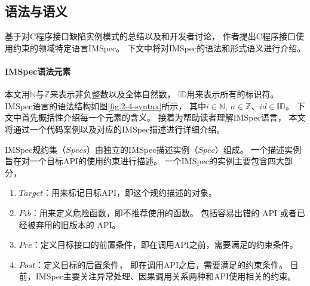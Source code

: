 \newcommand{\Nat}{\mathbb{N}}
\newcommand{\Int}{\mathbb{Z}}
\newcommand{\ID}{\mathbb{ID}}
\newcommand{\Cond}{\mathit{Cond}}
\newcommand{\true}{\texttt{true}}
\newcommand{\Pre}{\mathit{Pre}}
\newcommand{\Post}{\mathit{Post}}
\newcommand{\Fib}{\mathit{Fib}}
\newcommand{\Ret}{\mathit{Return}}
\newcommand{\ReturnFun}[1]{\texttt{\textbf{RETURN}(}#1\texttt{)}}
\newcommand{\Call}{\mathit{Call}}
\newcommand{\CallFun}[1]{\texttt{\textbf{Call}(}#1\texttt{)}}
\newcommand{\NULL}{\texttt{\textbf{NULL}}}
\newcommand{\FunName}{\mathit{FunName}}
\newcommand{\FunSig}{\mathit{FunSig}}
\newcommand{\Action}{\mathit{Action}}
\newcommand{\Arg}{\mathit{Arg}}
\newcommand{\Opd}{\mathit{Opd}}
\newcommand{\MemberOp}{\mathit{MemberOp}}
\newcommand{\CmpOp}{\mathit{CmpOp}}
\newcommand{\UnOp}{\mathit{UnOp}}
\newcommand{\Set}{\mathit{Set}}
\newcommand{\Type}{\mathit{Type}}
\newcommand{\IN}{\texttt{IN}}
\newcommand{\NOTIN}{\texttt{NOTIN}}
\newcommand{\LEN}{\texttt{LEN}}
\newcommand{\TYPE}{\texttt{TYPE}}
\newcommand{\MEMTYPE}{\texttt{MEMTYPE}}
\newcommand{\myid}{\mathit{id}}
\newcommand{\Target}{\mathit{Target}}
\newcommand{\Spec}{\mathit{Spec}}
\newcommand{\Specs}{\mathit{Specs}}

\subsection{语法与语义}
基于对C程序接口缺陷实例模式的总结以及和开发者讨论，
作者提出C程序接口使用约束的领域特定语言IMSpec。
下文中将对IMSpec的语法和形式语义进行介绍。

\paragraph{IMSpec语法元素}
本文用$\Nat$与$\Int$来表示非负整数以及全体自然数，
$\ID$用来表示所有的标识符。
IMSpec语言的语法结构如图\ref{fig:2-4-syntax}所示，
其中$i\in\Nat$, $n\in\Int$、$id \in \ID$。
下文中首先概括性介绍每一个元素的含义。
接着为帮助读者理解IMSpec语言，
本文将通过一个代码案例以及对应的IMSpec描述进行详细介绍。

IMSpec规约集（$\Specs$）由独立的IMSpec描述实例（$\Spec$）组成。
一个描述实例旨在对一个目标API的使用约束进行描述。
一个IMSpec的实例主要包含四大部分，
\begin{enumerate}
	\item $\Target$：用来标记目标API，即这个规约描述的对象。
	\item $\Fib$：用来定义危险函数，即不推荐使用的函数。
	包括容易出错的 API 或者已经被弃用的旧版本的 API。
	\item $\Pre$：定义目标接口的前置条件，即在调用API之前，需要满足的约束条件。
	\item $\Post$：定义目标的后置条件，
	即在调用API之后，需要满足的约束条件。
	目前，IMSpec主要关注异常处理、因果调用关系两种和API使用相关的约束。
\end{enumerate}

